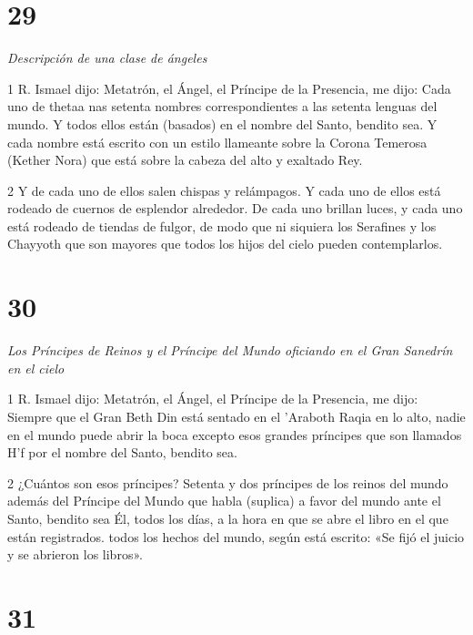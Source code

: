 \chapter{29}

\par \textit{Descripción de una clase de ángeles}

\par 1 R. Ismael dijo: Metatrón, el Ángel, el Príncipe de la Presencia, me dijo: Cada uno de thetaa nas setenta nombres correspondientes a las setenta lenguas del mundo. Y todos ellos están (basados) en el nombre del Santo, bendito sea. Y cada nombre está escrito con un estilo llameante sobre la Corona Temerosa (Kether Nora) que está sobre la cabeza del alto y exaltado Rey.

\par 2 Y de cada uno de ellos salen chispas y relámpagos. Y cada uno de ellos está rodeado de cuernos de esplendor alrededor. De cada uno brillan luces, y cada uno está rodeado de tiendas de fulgor, de modo que ni siquiera los Serafines y los Chayyoth que son mayores que todos los hijos del cielo pueden contemplarlos.

\chapter{30}

\par \textit{Los Príncipes de Reinos y el Príncipe del Mundo oficiando en el Gran Sanedrín en el cielo}

\par 1 R. Ismael dijo: Metatrón, el Ángel, el Príncipe de la Presencia, me dijo: Siempre que el Gran Beth Din está sentado en el 'Araboth Raqia en lo alto, nadie en el mundo puede abrir la boca excepto esos grandes príncipes que son llamados H'f por el nombre del Santo, bendito sea.

\par 2 ¿Cuántos son esos príncipes? Setenta y dos príncipes de los reinos del mundo además del Príncipe del Mundo que habla (suplica) a favor del mundo ante el Santo, bendito sea Él, todos los días, a la hora en que se abre el libro en el que están registrados. todos los hechos del mundo, según está escrito: «Se fijó el juicio y se abrieron los libros».

\chapter{31}


